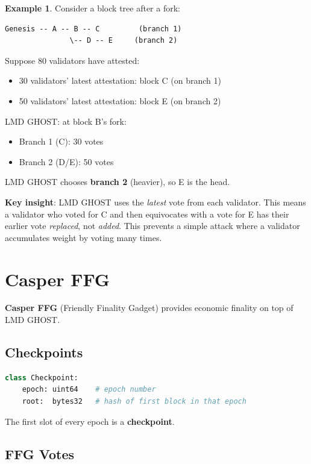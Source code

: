 \documentclass[12pt,a4paper,openany]{book}
\theoremstyle{definition}
\newtheorem{example}{Example}[chapter]
\theoremstyle{plain}
\theoremstyle{remark}
\begin{document}
\begin{example}
  Consider a block tree after a fork:
\begin{lstlisting}[language={}]
Genesis -- A -- B -- C         (branch 1)
               \-- D -- E     (branch 2)
\end{lstlisting}
  Suppose 80 validators have attested:
  \begin{itemize}
    \item 30 validators' latest attestation: block C (on branch 1)
    \item 50 validators' latest attestation: block E (on branch 2)
  \end{itemize}
  LMD GHOST: at block B's fork:
  \begin{itemize}
    \item Branch 1 (C): 30 votes
    \item Branch 2 (D/E): 50 votes
  \end{itemize}
  LMD GHOST chooses \textbf{branch 2} (heavier), so E is the head.
\end{example}

\textbf{Key insight}: LMD GHOST uses the \emph{latest} vote from each
validator.  This means a validator who voted for C and then equivocates
with a vote for E has their earlier vote \emph{replaced}, not
\emph{added}.  This prevents a simple attack where a validator
accumulates weight by voting many times.

\section{Casper FFG}

\textbf{Casper FFG} (Friendly Finality Gadget) provides economic
finality on top of LMD GHOST.

\subsection{Checkpoints}

\begin{lstlisting}[language=Python]
class Checkpoint:
    epoch: uint64    # epoch number
    root:  bytes32   # hash of first block in that epoch
\end{lstlisting}

The first slot of every epoch is a \textbf{checkpoint}.

\subsection{FFG Votes}
\end{document}
